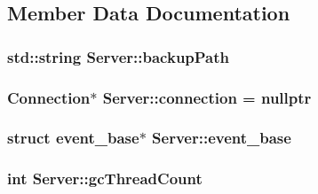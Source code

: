\subsection{Member Data Documentation}
\subsubsection[{\texorpdfstring{backup\+Path}{backupPath}}]{\setlength{\rightskip}{0pt plus 5cm}std\+::string Server\+::backup\+Path\hspace{0.3cm}{\ttfamily [protected]}}\hypertarget{class_server_a5519da36a05003e5b724f6c0ae6a80a0}{}\label{class_server_a5519da36a05003e5b724f6c0ae6a80a0}
\subsubsection[{\texorpdfstring{connection}{connection}}]{\setlength{\rightskip}{0pt plus 5cm}Connection$\ast$ Server\+::connection = nullptr\hspace{0.3cm}{\ttfamily [protected]}}\hypertarget{class_server_a3e056084670831acaff47913ac9e87cd}{}\label{class_server_a3e056084670831acaff47913ac9e87cd}
\subsubsection[{\texorpdfstring{event\+\_\+base}{event_base}}]{\setlength{\rightskip}{0pt plus 5cm}struct event\+\_\+base$\ast$ Server\+::event\+\_\+base\hspace{0.3cm}{\ttfamily [protected]}}\hypertarget{class_server_afd7e0781dcfb8315807e3b173f84d8a9}{}\label{class_server_afd7e0781dcfb8315807e3b173f84d8a9}
\subsubsection[{\texorpdfstring{gc\+Thread\+Count}{gcThreadCount}}]{\setlength{\rightskip}{0pt plus 5cm}int Server\+::gc\+Thread\+Count\hspace{0.3cm}{\ttfamily [protected]}}\hypertarget{class_server_a3586f498f31d9b52f122b48dff5bebb8}{}\label{class_server_a3586f498f31d9b52f122b48dff5bebb8}
